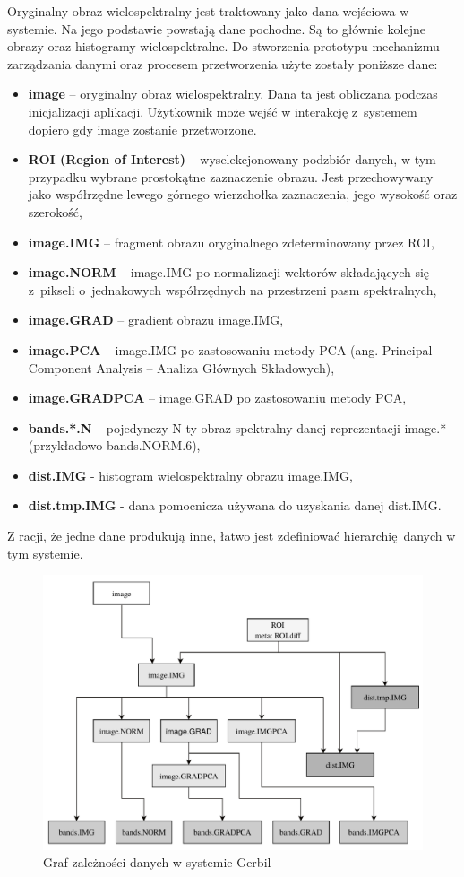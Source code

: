 Oryginalny obraz wielospektralny jest traktowany jako dana wejściowa w systemie. Na jego podstawie powstają dane pochodne. Są to głównie kolejne obrazy oraz histogramy wielospektralne. Do stworzenia prototypu mechanizmu zarządzania danymi oraz procesem przetworzenia użyte zostały poniższe dane:
\begin{itemize}
	\item {} \textbf{image} -- oryginalny obraz wielospektralny. Dana ta jest obliczana podczas inicjalizacji aplikacji. Użytkownik może wejść w interakcję z~systemem dopiero gdy image zostanie przetworzone.
	\item {} \textbf{ROI (Region of Interest)} -- wyselekcjonowany podzbiór danych, w tym przypadku wybrane prostokątne zaznaczenie obrazu. Jest przechowywany jako współrzędne lewego górnego wierzchołka zaznaczenia, jego wysokość oraz szerokość,
	\item {} \textbf{image.IMG} -- fragment obrazu oryginalnego zdeterminowany przez ROI,
	\item {} \textbf{image.NORM} -- image.IMG po normalizacji wektorów składających się z~pikseli o~jednakowych współrzędnych na przestrzeni pasm spektralnych,
	\item {} \textbf{image.GRAD} -- gradient obrazu image.IMG,
	\item {} \textbf{image.PCA} -- image.IMG po zastosowaniu metody PCA (ang. Principal Component Analysis -- Analiza Głównych Składowych)\cite{PCA},
	\item {} \textbf{image.GRADPCA} -- image.GRAD po zastosowaniu metody PCA,
	\item {} \textbf{bands.*.N} -- pojedynczy N-ty obraz spektralny danej reprezentacji image.* (przykładowo bands.NORM.6),
	\item {} \textbf{dist.IMG} - histogram wielospektralny obrazu image.IMG,
	\item {} \textbf{dist.tmp.IMG} - dana pomocnicza używana do uzyskania danej dist.IMG. 
\end{itemize}
Z racji, że jedne dane produkują inne, łatwo jest zdefiniować hierarchię danych w tym systemie.

\begin{figure}[ht]
	\centering
		\includegraphics[width=0.7\linewidth]{rys02/data-dependencies}
	\caption{Graf zależności danych w systemie Gerbil}
	\label{fig:data-dependencies}	
\end{figure}

